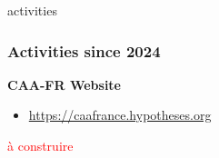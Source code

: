 \documentclass[t,aspectratio=169,xcolor=dvipsnames]{beamer}
\begin{document}

\begin{frame}{activities}
	
	\frametitle{Activities since 2024}
	
	\begin{block}{\textbf{CAA-FR Website}}
		
		\begin{itemize}
			\item \href{https://caafrance.hypotheses.org}{https://caafrance.hypotheses.org}
		\end{itemize}
		
	\end{block}
	
	\textcolor{red}{à construire}
	
\end{frame}

\end{document}
